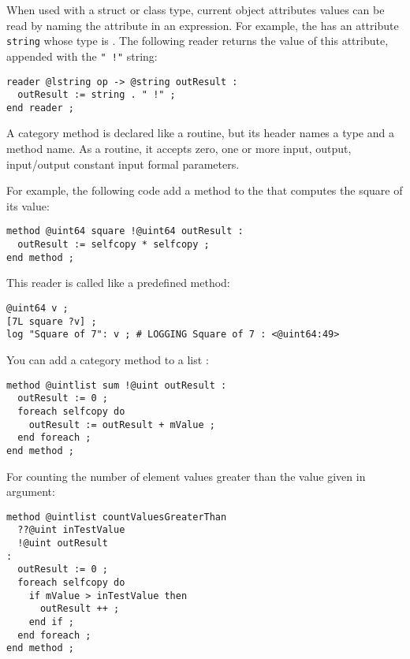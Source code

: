 When used with a struct or class type, current object attributes values can be read by naming the attribute in an expression. For example, the  has an attribute 
\lstinline[language=galgas]!string! whose type is . The following reader returns the value of this attribute, appended with the \lstinline[language=galgas]?" !"? string:
\begin{lstlisting}[language=galgas]
reader @lstring op -> @string outResult :
  outResult := string . " !" ;
end reader ;
\end{lstlisting}








A category method is declared like a routine, but its header names a type and a method name. As a routine, it accepts zero, one or more input, output, input/output constant input formal parameters.

For example, the following code add a method to the  that computes the square of its value:
\begin{lstlisting}[language=galgas]
method @uint64 square !@uint64 outResult :
  outResult := selfcopy * selfcopy ;
end method ;
\end{lstlisting}

This reader is called like a predefined method:
\begin{lstlisting}[language=galgas]
@uint64 v ;
[7L square ?v] ;
log "Square of 7": v ; # LOGGING Square of 7 : <@uint64:49>
\end{lstlisting}

You can add a category method to a list :
\begin{lstlisting}[language=galgas]
method @uintlist sum !@uint outResult :
  outResult := 0 ;
  foreach selfcopy do
    outResult := outResult + mValue ;
  end foreach ;
end method ;
\end{lstlisting}

For counting the number of element values greater than the value given in argument:
\begin{lstlisting}[language=galgas]
method @uintlist countValuesGreaterThan
  ??@uint inTestValue
  !@uint outResult
:
  outResult := 0 ;
  foreach selfcopy do
    if mValue > inTestValue then
      outResult ++ ;
    end if ;
  end foreach ;
end method ;
\end{lstlisting}

